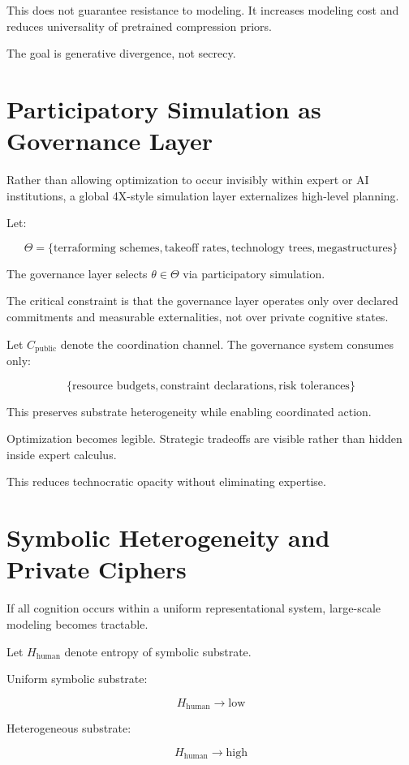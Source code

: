 \documentclass[12pt]{article}
\begin{document}
This does not guarantee resistance to modeling. It increases modeling cost and reduces universality of pretrained compression priors.

The goal is generative divergence, not secrecy.

\section{Participatory Simulation as Governance Layer}

Rather than allowing optimization to occur invisibly within expert or AI institutions, a global 4X-style simulation layer externalizes high-level planning.

Let:

\[
\Theta = \{\text{terraforming schemes}, \text{takeoff rates}, \text{technology trees}, \text{megastructures}\}
\]

The governance layer selects $\theta \in \Theta$ via participatory simulation.

The critical constraint is that the governance layer operates only over declared commitments and measurable externalities, not over private cognitive states.

Let $C_{\text{public}}$ denote the coordination channel. The governance system consumes only:

\[
\{ \text{resource budgets}, \text{constraint declarations}, \text{risk tolerances} \}
\]

This preserves substrate heterogeneity while enabling coordinated action.

Optimization becomes legible. Strategic tradeoffs are visible rather than hidden inside expert calculus.

This reduces technocratic opacity without eliminating expertise.

\section{Symbolic Heterogeneity and Private Ciphers}

If all cognition occurs within a uniform representational system, large-scale modeling becomes tractable.

Let $H_{\text{human}}$ denote entropy of symbolic substrate.

Uniform symbolic substrate:

\[
H_{\text{human}} \to \text{low}
\]

Heterogeneous substrate:

\[
H_{\text{human}} \to \text{high}
\]
\end{document}
